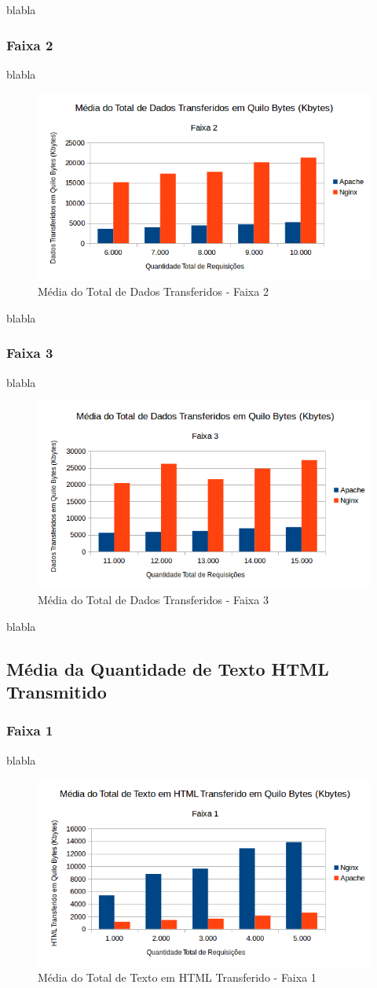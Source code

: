 blabla

\subsubsection{Faixa 2}
blabla

\begin{figure}[H]
	\centering
	\includegraphics[width=0.6\linewidth]{graficos/grafico2-f2} 
	\caption{Média do Total de Dados Transferidos - Faixa 2}
	\label{fig:grafico2-f2}
\end{figure}
blabla

\subsubsection{Faixa 3}
blabla

\begin{figure}[H]
	\centering
	\includegraphics[width=0.6\linewidth]{graficos/grafico2-f3} 
	\caption{Média do Total de Dados Transferidos - Faixa 3}
	\label{fig:grafico2-f3}
\end{figure}
blabla

\subsection{Média da Quantidade de Texto HTML Transmitido}
\subsubsection{Faixa 1}

blabla
\begin{figure}[H]
	\centering
	\includegraphics[width=0.6\linewidth]{graficos/grafico3-f1} 
	\caption{Média do Total de Texto em HTML Transferido - Faixa 1}
	\label{fig:grafico3-f1}
\end{figure}

